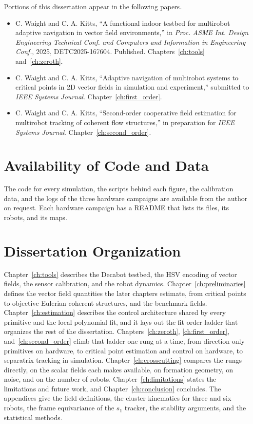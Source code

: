 Portions of this dissertation appear in the following papers.
\begin{itemize}
\item C. Waight and C. A. Kitts, ``A functional indoor testbed for
multirobot adaptive navigation in vector field environments,'' in
\textit{Proc. ASME Int. Design Engineering Technical Conf. and Computers
and Information in Engineering Conf.}, 2025, DETC2025-167604. Published.
Chapters~\ref{ch:tools} and~\ref{ch:zeroth}.
\item C. Waight and C. A. Kitts, ``Adaptive navigation of multirobot
systems to critical points in 2D vector fields in simulation and
experiment,'' submitted to \textit{IEEE Systems Journal}.
Chapter~\ref{ch:first_order}.
\item C. Waight and C. A. Kitts, ``Second-order cooperative field
estimation for multirobot tracking of coherent flow structures,'' in
preparation for \textit{IEEE Systems Journal}.
Chapter~\ref{ch:second_order}.
\end{itemize}

\section{Availability of Code and Data}
\label{sec:ch1:availability}

The code for every simulation, the scripts behind each figure, the
calibration data, and the logs of the three hardware campaigns are
available from the author on request. Each hardware campaign has a README
that lists its files, its robots, and its maps.

\section{Dissertation Organization}
\label{sec:ch1:organization}

Chapter~\ref{ch:tools} describes the Decabot testbed, the HSV encoding of
vector fields, the sensor calibration, and the robot dynamics.
Chapter~\ref{ch:preliminaries} defines the vector field quantities the
later chapters estimate, from critical points to objective Eulerian
coherent structures, and the benchmark fields.
Chapter~\ref{ch:estimation} describes the control architecture shared by
every primitive and the local polynomial fit, and it lays out the
fit-order ladder that organizes the rest of the dissertation.
Chapters~\ref{ch:zeroth}, \ref{ch:first_order}, and~\ref{ch:second_order}
climb that ladder one rung at a time, from direction-only primitives on
hardware, to critical point estimation and control on hardware, to
separatrix tracking in simulation. Chapter~\ref{ch:crosscutting} compares
the rungs directly, on the scalar fields each makes available, on
formation geometry, on noise, and on the number of robots.
Chapter~\ref{ch:limitations} states the limitations and future work, and
Chapter~\ref{ch:conclusion} concludes. The appendices give the field
definitions, the cluster kinematics for three and six robots, the frame
equivariance of the $s_1$ tracker, the stability arguments, and the
statistical methods.
